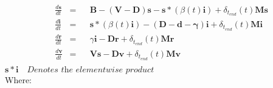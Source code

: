 \documentclass{article}
\begin{document}
\begin{align*}
&\frac{d\mathbf{s}}{dt} &=&& \mathbf{B} - (\mathbf{V} - \mathbf{D})\mathbf{s} - \mathbf{s}*(\beta(t)\mathbf
{i})+\delta_{t_{end}}(t)\mathbf{M}\mathbf{s}\\
&\frac{d\mathbf{i}}{dt} &=&&\mathbf{s}*(\beta(t)\mathbf
{i}) - (\mathbf{D}-\mathbf{d} - \mathbf{\gamma})\mathbf{i}+\delta_{t_{end}}(t)\mathbf{M}\mathbf{i}\\
&\frac{d\mathbf{r}}{dt} &=&& \gamma\mathbf{i} - \mathbf{D}\mathbf{r}+\delta_{t_{end}}(t)\mathbf{M}\mathbf{r}\\
&\frac{d\mathbf{v}}{dt} &=&& \mathbf{V}\mathbf{s}-\mathbf{D}\mathbf{v} +\delta_{t_{end}}(t)\mathbf{M}\mathbf{v}\\
\end{align*}
$\mathbf{s}*\mathbf{i}\quad\textit{Denotes the elementwise product}$\\
Where:
\end{document}
